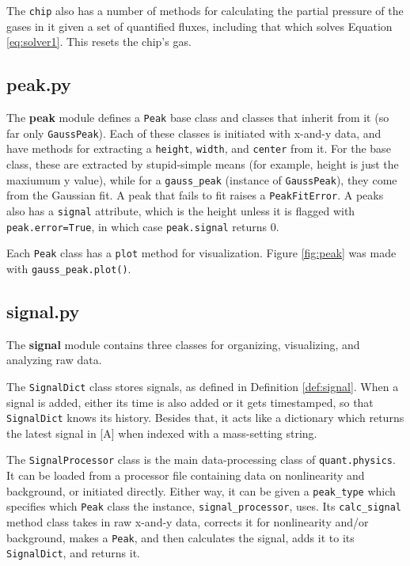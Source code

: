 \documentclass{article}
\newcommand{\code}[1]{\colorbox{codegray}{\lstinline{#1}}}
\begin{document}
The \code{chip} also has a number of methods for calculating the partial pressure of the gases in it given a set of quantified fluxes, including that which solves Equation \ref{eq:solver1}. This resets the chip's gas.

\subsection{peak.py}\label{sec:peak}

The \textbf{peak} module defines a \code{Peak} base class and classes that inherit from it (so far only \code{GaussPeak}). Each of these classes is initiated with x-and-y data, and have methods for extracting a \code{height}, \code{width}, and \code{center} from it. For the base class, these are extracted by stupid-simple means (for example, height is just the maxiumum y value), while for a \code{gauss_peak} (instance of \code{GaussPeak}), they come from the Gaussian fit. A peak that fails to fit raises a \code{PeakFitError}. A peaks also has a \code{signal} attribute, which is the height unless it is flagged with \code{peak.error=True}, in which case \code{peak.signal} returns 0. 

Each \code{Peak} class has a \code{plot} method for visualization. Figure \ref{fig:peak} was made with \code{gauss_peak.plot()}.

\subsection{signal.py}\label{sec:signal}

The \textbf{signal} module contains three classes for organizing, visualizing, and analyzing raw data. 

The \code{SignalDict} class stores signals, as defined in Definition \ref{def:signal}. When a signal is added, either its time is also added or it gets timestamped, so that \code{SignalDict} knows its history. Besides that, it acts like a dictionary which returns the latest signal in [A] when indexed with a mass-setting string.

The \code{SignalProcessor} class is the main data-processing class of \code{quant.physics}. It can be loaded from a processor file containing data on nonlinearity and background, or initiated directly. Either way, it can be given a \code{peak_type} which specifies which \code{Peak} class the instance, \code{signal_processor}, uses. Its \code{calc_signal} method class takes in raw x-and-y data, corrects it for nonlinearity and/or background, makes a \code{Peak}, and then calculates the signal, adds it to its \code{SignalDict}, and returns it. 
\end{document}
